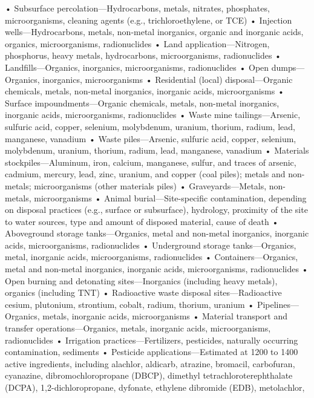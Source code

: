 \documentclass{article}
\begin{document}
• Subsurface percolation---Hydrocarbons, metals, nitrates, phosphates,
microorganisms, cleaning agents (e.g., trichloroethylene, or TCE) •
Injection wells---Hydrocarbons, metals, non-metal inorganics, organic
and inorganic acids, organics, microorganisms, radionuclides • Land
application---Nitrogen, phosphorus, heavy metals, hydrocarbons,
microorganisms, radionuclides • Landfills---Organics, inorganics,
microorganisms, radionuclides • Open dumps---Organics, inorganics,
microorganisms • Residential (local) disposal---Organic chemicals,
metals, non-metal inorganics, inorganic acids, microorganisms • Surface
impoundments---Organic chemicals, metals, non-metal inorganics,
inorganic acids, microorganisms, radionuclides • Waste mine
tailings---Arsenic, sulfuric acid, copper, selenium, molybdenum,
uranium, thorium, radium, lead, manganese, vanadium • Waste
piles---Arsenic, sulfuric acid, copper, selenium, molybdenum, uranium,
thorium, radium, lead, manganese, vanadium • Materials
stockpiles---Aluminum, iron, calcium, manganese, sulfur, and traces of
arsenic, cadmium, mercury, lead, zinc, uranium, and copper (coal piles);
metals and non-metals; microorganisms (other materials piles) •
Graveyards---Metals, non-metals, microorganisms • Animal
burial---Site-specific contamination, depending on disposal practices
(e.g., surface or subsurface), hydrology, proximity of the site to water
sources, type and amount of disposed material, cause of death •
Aboveground storage tanks---Organics, metal and non-metal inorganics,
inorganic acids, microorganisms, radionuclides • Underground storage
tanks---Organics, metal, inorganic acids, microorganisms, radionuclides
• Containers---Organics, metal and non-metal inorganics, inorganic
acids, microorganisms, radionuclides • Open burning and detonating
sites---Inorganics (including heavy metals), organics (including TNT) •
Radioactive waste disposal sites---Radioactive cesium, plutonium,
strontium, cobalt, radium, thorium, uranium • Pipelines---Organics,
metals, inorganic acids, microorganisms • Material transport and
transfer operations---Organics, metals, inorganic acids, microorganisms,
radionuclides • Irrigation practices---Fertilizers, pesticides,
naturally occurring contamination, sediments • Pesticide
applications---Estimated at 1200 to 1400 active ingredients, including
alachlor, aldicarb, atrazine, bromacil, carbofuran, cyanazine,
dibromochloropropane (DBCP), dimethyl tetrachloroterephthalate (DCPA),
1,2-dichloropropane, dyfonate, ethylene dibromide (EDB), metolachlor,
\end{document}

